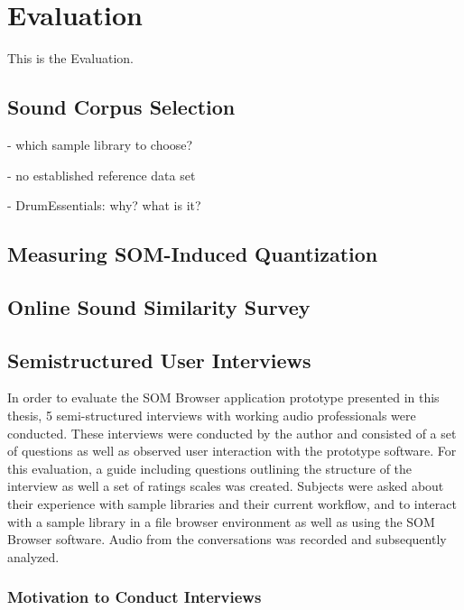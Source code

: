 
\section{Evaluation}
\label{sec:evaluation}
This is the Evaluation.

\subsection{Sound Corpus Selection}
\label{subsec:eval_corpus_selection}
- which sample library to choose?

- no established reference data set

- DrumEssentials: why? what is it?

\subsection{Measuring SOM-Induced Quantization}
\label{subsec:evaluation_tech}

\subsection{Online Sound Similarity Survey}
\label{subsec:evaluation_survey}

\subsection{Semistructured User Interviews}
\label{subsec:evaluation_interviews}

In order to evaluate the SOM Browser application prototype presented in this
thesis, 5 semi-structured interviews with working audio professionals were
conducted. These interviews were conducted by the author and consisted of a set
of questions as well as observed user interaction with the prototype software.
For this evaluation, a guide including questions outlining the
structure of the interview as well a set of ratings scales was created. Subjects
were asked about their experience with sample libraries and their current
workflow, and to interact with a sample library in a file browser environment as
well as using the SOM Browser software. Audio from the conversations was
recorded and subsequently analyzed.

\subsubsection{Motivation to Conduct Interviews}
\label{subsubsec:interview_motivation}


